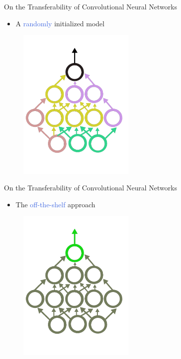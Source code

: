 \documentclass{beamer}
\begin{document}
\begin{frame}{On the Transferability of Convolutional Neural Networks}
	
	\bigskip

	\begin{itemize}
		\item A \textcolor{RoyalBlue}{randomly} initialized model
	\end{itemize}

	\bigskip

	\begin{figure}
		\includegraphics[width=0.5\textwidth]{figures/random_net.pdf}
	\end{figure}

\end{frame}

\begin{frame}{On the Transferability of Convolutional Neural Networks}
	
	\bigskip

	\begin{itemize}
		\item The \textcolor{RoyalBlue}{off-the-shelf} approach 
	\end{itemize}

	\bigskip

	\begin{figure}
		\includegraphics[width=0.5\textwidth]{figures/frozen_net.pdf}
	\end{figure}

\end{frame}
\end{document}
